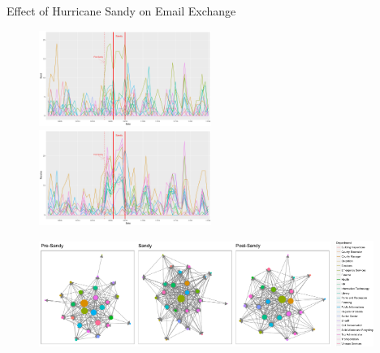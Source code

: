 \documentclass[10pt]{beamer}
\theoremstyle{definition}
\theoremstyle{remark}
\begin{document}
\begin{frame}{Effect of Hurricane Sandy on Email Exchange}
	 	 \begin{figure}
	 	 	\includegraphics[width=0.5\textwidth]{Sendplot2.pdf}	 	
	 	 	\includegraphics[width=0.5\textwidth]{Receiveplot2.pdf}
	 	 \end{figure}	
	 \begin{figure}
	 		 	\includegraphics[width=0.85\textwidth]{Networkplot.pdf}
	 		 	\hspace{0.1cm}
	 		 		 	\includegraphics[width=0.11\textwidth]{Dept2.jpg}
	 \end{figure}	
\end{frame}
\end{document}
